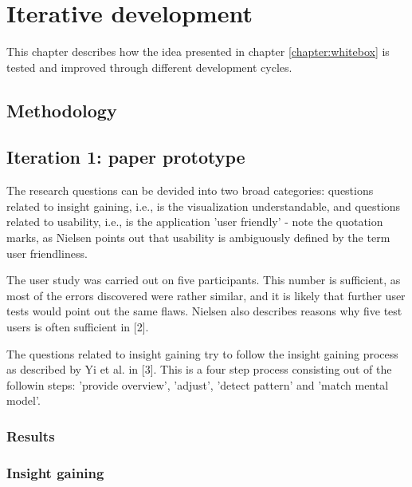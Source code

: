 \chapter{Iterative development}\label{chapter:prototype}


This chapter describes how the idea presented in chapter \ref{chapter:whitebox} is tested and improved through different development cycles.


\section{Methodology}\label{chapter:prototype:section:methodology}




\section{Iteration 1: paper prototype}\label{chapter:prototype:section:paper}

The research questions can be devided into two broad categories: questions related to insight gaining, i.e., is the visualization understandable, and questions related to usability, i.e., is the application 'user friendly' - note the quotation marks, as Nielsen points out that usability is ambiguously defined by the term user friendliness\cite{nielsen:1993:UE:529793}.

The user study was carried out on five participants. This number is sufficient, as most of the errors discovered were rather similar, and it is likely that further user tests would point out the same flaws. Nielsen also describes reasons why five test users is often sufficient in [2].

The questions related to insight gaining try to follow the insight gaining process as described by Yi et al. in [3]. This is a four step process consisting out of the followin steps: 'provide overview', 'adjust', 'detect pattern' and 'match mental model'.

\subsection{Results}

\subsection{Insight gaining}

